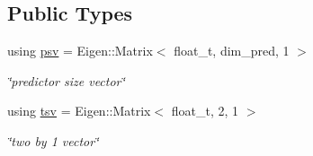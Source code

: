 \subsection*{Public Types}
\begin{DoxyCompactItemize}
\item 
\mbox{\label{classgamFilter_ae43550158ad06de3a1829d5cb491b3fc}} 
using \hyperlink{classgamFilter_ae43550158ad06de3a1829d5cb491b3fc}{psv} = Eigen\+::\+Matrix$<$ float\+\_\+t, dim\+\_\+pred, 1 $>$
\begin{DoxyCompactList}\small\item\em \char`\"{}predictor size vector\char`\"{} \end{DoxyCompactList}\item 
\mbox{\label{classgamFilter_ab8cbe50cc21d9a9474c0e2b9b45a6162}} 
using \hyperlink{classgamFilter_ab8cbe50cc21d9a9474c0e2b9b45a6162}{tsv} = Eigen\+::\+Matrix$<$ float\+\_\+t, 2, 1 $>$
\begin{DoxyCompactList}\small\item\em \char`\"{}two by 1 vector\char`\"{} \end{DoxyCompactList}\end{DoxyCompactItemize}
